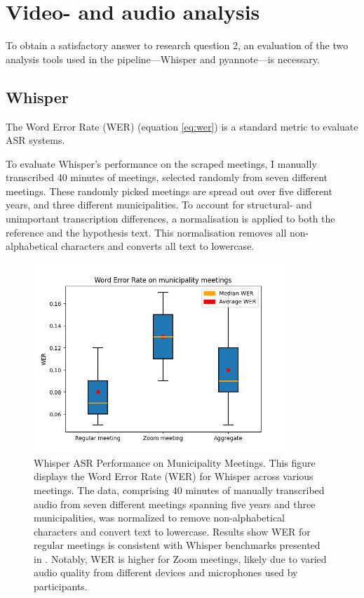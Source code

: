 \documentclass[twoside]{uva-inf-bachelor-thesis}
\begin{document}
\section{Video- and audio analysis}\label{sec:vidanalysisExp}
To obtain a satisfactory answer to research question 2, an evaluation of the two analysis tools used in the pipeline—Whisper and pyannote—is necessary.

\subsection{Whisper}\label{sec:whisperExp}
The Word Error Rate (WER) (equation \ref{eq:wer}) is a standard metric to evaluate ASR systems. 

To evaluate Whisper's performance on the scraped meetings, I manually transcribed 40 minutes of meetings, selected randomly from seven different meetings. These randomly picked meetings are spread out over five different years, and three different municipalities. 
To account for structural- and unimportant transcription differences, a normalisation is applied to both the reference and the hypothesis text. 
This normalisation removes all non-alphabetical characters and converts all text to lowercase.

\begin{figure}
    \centering
    \includegraphics[width=0.85\textwidth]{images/whisperBench.png}
    \caption{Whisper ASR Performance on Municipality Meetings. This figure displays the Word Error Rate (WER) for Whisper across various meetings. The data, comprising 40 minutes of manually transcribed audio from seven different meetings spanning five years and three municipalities, was normalized to remove non-alphabetical characters and convert text to lowercase. Results show WER for regular meetings is consistent with Whisper benchmarks presented in \cite{radford2023robust}. Notably, WER is higher for Zoom meetings, likely due to varied audio quality from different devices and microphones used by participants.}
    \label{fig:whisperExperiment}
\end{figure}
\end{document}
